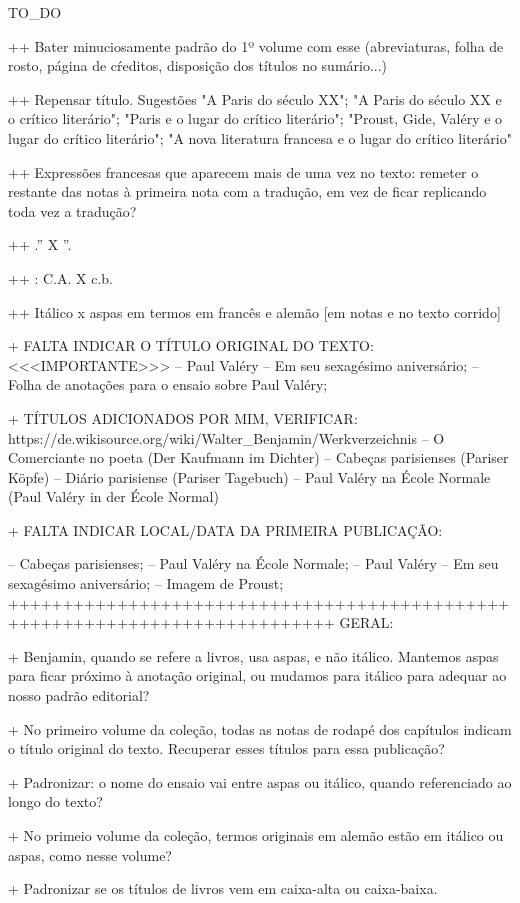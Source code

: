 TO_DO

++ Bater minuciosamente padrão do 1º volume com esse (abreviaturas, folha de rosto, página de cŕeditos, disposição dos títulos no sumário...)

++ Repensar título. Sugestões "A Paris do século XX"; "A Paris do século XX e o crítico literário"; "Paris e o lugar do crítico literário"; "Proust, Gide, Valéry e o lugar do crítico literário"; "A nova literatura francesa e o lugar do crítico literário"

++ Expressões francesas que aparecem mais de uma vez no texto: remeter o restante das notas à primeira nota com a tradução, em vez de ficar replicando toda vez a tradução?

++ .'' X ''.

++ : C.A. X c.b.

++ Itálico x aspas em termos em francês e alemão [em notas e no texto corrido]

+ FALTA INDICAR O TÍTULO ORIGINAL DO TEXTO: <<<IMPORTANTE>>>
-- Paul Valéry – Em seu sexagésimo aniversário;
-- Folha de anotações para o ensaio sobre Paul Valéry;

+ TÍTULOS ADICIONADOS POR MIM, VERIFICAR:
https://de.wikisource.org/wiki/Walter_Benjamin/Werkverzeichnis
-- O Comerciante no poeta (Der Kaufmann im Dichter)
-- Cabeças parisienses (Pariser Köpfe)
-- Diário parisiense (Pariser Tagebuch)
-- Paul Valéry na École Normale (Paul Valéry in der École Normal)


+ FALTA INDICAR LOCAL/DATA DA PRIMEIRA PUBLICAÇÃO:

-- Cabeças parisienses; 
-- Paul Valéry na École Normale;
-- Paul Valéry – Em seu sexagésimo aniversário;
-- Imagem de Proust; 
++++++++++++++++++++++++++++++++++++++++++++++++++++++++++++++++++++++++++++
GERAL:

+ Benjamin, quando se refere a livros, usa aspas, e não itálico. Mantemos aspas para ficar próximo à anotação original, ou mudamos para itálico para adequar ao nosso padrão editorial?

+ No primeiro volume da coleção, todas as notas de rodapé dos capítulos indicam o título original do texto. Recuperar esses títulos para essa publicação?

+ Padronizar: o nome do ensaio vai entre aspas ou itálico, quando referenciado ao longo do texto?

+ No primeio volume da coleção, termos originais em alemão estão em itálico ou aspas, como nesse volume?

+ Padronizar se os títulos de livros vem em caixa-alta ou caixa-baixa.

